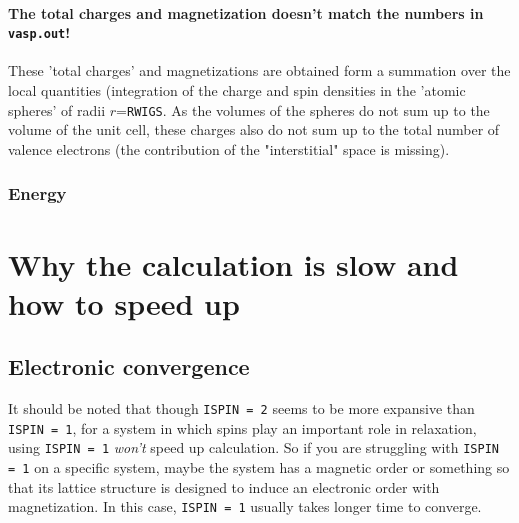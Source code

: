 \documentclass[hyperref, a4paper]{article}
\begin{document}
\paragraph{The total charges and magnetization doesn't match the numbers in \texttt{vasp.out}!}

These 'total charges' and magnetizations are obtained form a summation over the local quantities (integration of the charge and spin densities in the 'atomic spheres' of radii $r$=\texttt{RWIGS}. 
As the volumes of the spheres do not sum up to the volume of the unit cell, these charges also do not sum up to the total number of valence electrons (the contribution of the "interstitial" space is missing).

\subsubsection{Energy}

\section{Why the calculation is slow and how to speed up}

\subsection{Electronic convergence}

It should be noted that though \texttt{ISPIN = 2} seems to be more expansive than \texttt{ISPIN = 1}, for a system in which spins play an important role in relaxation, using \texttt{ISPIN = 1} \emph{won't} speed up calculation.
So if you are struggling with \texttt{ISPIN = 1} on a specific system, maybe the system has a magnetic order or something so that its lattice structure is designed to induce an electronic order with magnetization.
In this case, \texttt{ISPIN = 1} usually takes longer time to converge.
\end{document}
